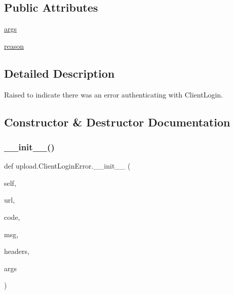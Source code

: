 \subsection*{Public Attributes}
\begin{DoxyCompactItemize}
\item 
\hyperlink{classupload_1_1_client_login_error_ac300a0b034b2bc64cedc51e09fb6d663}{args}
\item 
\hyperlink{classupload_1_1_client_login_error_ae0555feb182d89d1e4d7944afbfe14e5}{reason}
\end{DoxyCompactItemize}


\subsection{Detailed Description}
\begin{DoxyVerb}Raised to indicate there was an error authenticating with ClientLogin.\end{DoxyVerb}
 

\subsection{Constructor \& Destructor Documentation}
\mbox{\label{classupload_1_1_client_login_error_a1e590616c2976d881e155958cedbbe47}} 
\subsubsection{\texorpdfstring{\+\_\+\+\_\+init\+\_\+\+\_\+()}{\_\_init\_\_()}\hspace{0.1cm}{\footnotesize\ttfamily [1/2]}}
{\footnotesize\ttfamily def upload.\+Client\+Login\+Error.\+\_\+\+\_\+init\+\_\+\+\_\+ (\begin{DoxyParamCaption}\item[{}]{self,  }\item[{}]{url,  }\item[{}]{code,  }\item[{}]{msg,  }\item[{}]{headers,  }\item[{}]{args }\end{DoxyParamCaption})}

